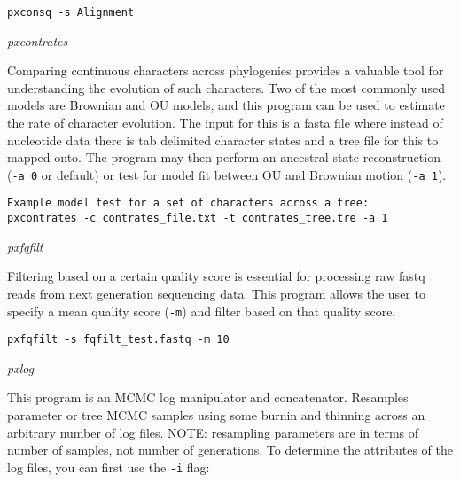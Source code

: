 \documentclass[12pt,letterpaper]{article}
\renewcommand{\subsection}[1]{%
\bigskip
\begin{center}
\begin{large}
\normalfont\itshape #1
\end{large}
\end{center}}
\begin{document}
\begin{flushleft}
\begin{verbatim}
pxconsq -s Alignment
\end{verbatim}
\end{flushleft}

\subsection{pxcontrates}

Comparing continuous characters across phylogenies provides a valuable tool for understanding the evolution of such characters. Two of the most commonly used models are Brownian and OU models, and this program can be used to estimate the rate of character evolution. The input for this is a fasta file where instead of nucleotide data there is tab delimited character states and a tree file for this to mapped onto. The program may then perform an ancestral state reconstruction (\texttt{-a 0} or default) or test for model fit between OU and Brownian motion (\texttt{-a 1}).

\begin{flushleft}
\begin{verbatim}
Example model test for a set of characters across a tree:
pxcontrates -c contrates_file.txt -t contrates_tree.tre -a 1
\end{verbatim}
\end{flushleft}

\subsection{pxfqfilt}

Filtering based on a certain quality score is essential for processing raw fastq reads from next generation sequencing data. This program allows the user to specify a mean quality score (\texttt{-m}) and filter based on that quality score.

\begin{flushleft}
\begin{verbatim}
pxfqfilt -s fqfilt_test.fastq -m 10
\end{verbatim}
\end{flushleft}

\subsection{pxlog}

This program is an MCMC log manipulator and concatenator. Resamples parameter or tree MCMC samples using some burnin and thinning across an arbitrary number of log files. NOTE: resampling parameters are in terms of number of samples, not number of generations. To determine the attributes of the log files, you can first use the \texttt{-i} flag:
\end{document}
